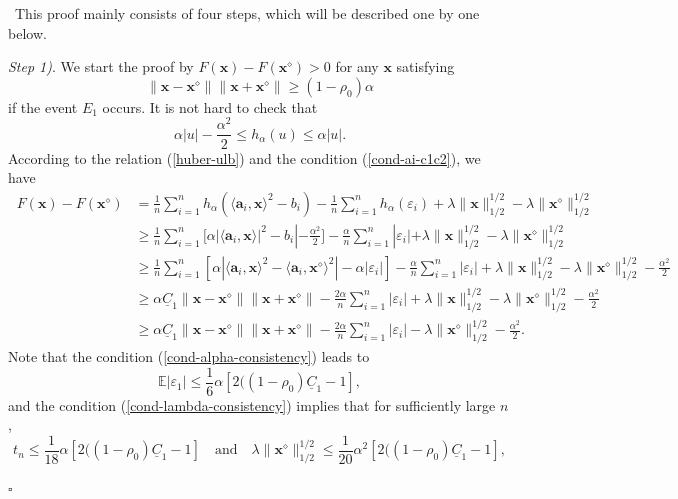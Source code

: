 \documentclass[10pt,a4paper]{amsart}
\newenvironment{proof}{{\noindent\bf Proof.}\,}{\hfill $\square$\par\mbox{}}
\begin{document}
\begin{proof}
 This proof mainly consists of four steps, which will be described one by one below. 

	
	\textit{Step 1)}. We start the proof by $F(\mathbf{x})-F(\mathbf{x}^\diamond)>0$ for any $\mathbf{x}$ satisfying $$\|\mathbf{x}-\mathbf{x}^\diamond\|\|\mathbf{x}+\mathbf{x}^\diamond\|\geq(1-\rho_0)\alpha$$ if the event $E_1$ occurs.
	It is not hard to check that \begin{equation}\label{huber-ulb}
		\alpha|u|-\frac{\alpha^2}{2}\leq	{h_{\alpha}(u)} \leq \alpha|u|.
	\end{equation}
	According to the relation (\ref{huber-ulb}) and the condition (\ref{cond-ai-c1c2}), we have
	\begin{equation}\label{Fx-lb}
		\begin{aligned}
			~F(\mathbf{x})-F(\mathbf{x}^\diamond)&=\frac{1}{n}\sum_{i=1}^nh_{\alpha}(\langle \mathbf{a}_i,\mathbf{x}\rangle^2-b_i)-\frac{1}{n}\sum_{i=1}^nh_{\alpha}(\varepsilon_i)+\lambda\|\mathbf{x}\|_{1/2}^{1/2}-\lambda\|\mathbf{x}^\diamond\|_{1/2}^{1/2}\\
			&\geq\frac{1}{n}\sum_{i=1}^n[\alpha|\langle \mathbf{a}_i,\mathbf{x}\rangle|^2-b_i|-\frac{\alpha^2}{2}]-\frac{\alpha}{n}\sum_{i=1}^n|\varepsilon_i|+\lambda\|\mathbf{x}\|_{1/2}^{1/2}-\lambda\|\mathbf{x}^\diamond\|_{1/2}^{1/2}\\
			&\geq\frac{1}{n}\sum_{i=1}^n[\alpha|\langle \mathbf{a}_i,\mathbf{x}\rangle^2-\langle \mathbf{a}_i,\mathbf{x}^\diamond\rangle^2|-\alpha|\varepsilon_i|]
			-\frac{\alpha}{n}\sum_{i=1}^n|\varepsilon_i|+\lambda\|\mathbf{x}\|_{1/2}^{1/2}-\lambda\|\mathbf{x}^\diamond\|_{1/2}^{1/2}-\frac{\alpha^2}{2}\\
			&\geq\alpha \underline{C}_1\|\mathbf{x}-\mathbf{x}^\diamond\|\|\mathbf{x}+\mathbf{x}^\diamond\|-\frac{2\alpha}{n}\sum_{i=1}^n|\varepsilon_i|+\lambda\|\mathbf{x}\|_{1/2}^{1/2}-\lambda\|\mathbf{x}^\diamond\|_{1/2}^{1/2}-\frac{\alpha^2}{2}\\	
			&\geq\alpha \underline{C}_1\|\mathbf{x}-\mathbf{x}^\diamond\|\|\mathbf{x}+\mathbf{x}^\diamond\|-\frac{2\alpha}{n}\sum_{i=1}^n|\varepsilon_i|-\lambda\|\mathbf{x}^\diamond\|_{1/2}^{1/2}-\frac{\alpha^2}{2}.			
		\end{aligned}
	\end{equation}
	Note that the condition (\ref{cond-alpha-consistency})  leads to
	$$\mathbb{E}|\varepsilon_1|\leq\frac{1}{6}\alpha[2((1-\rho_0)\underline{C}_1-1],$$
	and the condition (\ref{cond-lambda-consistency}) implies that for sufficiently large $n$, $$t_n\leq\frac{1}{18}\alpha[2((1-\rho_0)\underline{C}_1-1]\quad \mbox{and}\quad\lambda\|\mathbf{x}^\diamond\|_{1/2}^{1/2}\leq\frac{1}{20}\alpha^2[2((1-\rho_0)\underline{C}_1-1],$$

\end{proof}
\end{document}
